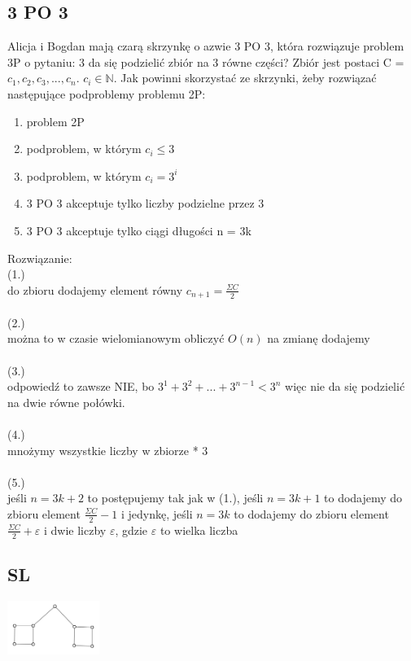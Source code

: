 \documentclass{article}
\begin{document}
\subsection*{3 PO 3}
Alicja i Bogdan mają czarą skrzynkę o azwie 3 PO 3, która rozwiązuje problem 3P o pytaniu: 3 da się podzielić zbiór na 3 równe części?
Zbiór jest postaci C = ${c_1, c_2, c_3, ..., c_n}$. $c_i \in \mathbb{N}$.
Jak powinni skorzystać ze skrzynki, żeby rozwiązać następujące podproblemy problemu 2P: 
\begin{enumerate}
	\item problem 2P
	\item podproblem, w którym $c_i \le 3$
	\item podproblem, w którym $c_i = 3^i$
	\item 3 PO 3 akceptuje tylko liczby podzielne przez 3
	\item 3 PO 3 akceptuje tylko ciągi długości n  =  3k
\end{enumerate}
Rozwiązanie: \\
(1.) \\
do zbioru dodajemy element równy $c_{n+1} =\frac{\Sigma C}{2}$ \\\\
(2.) \\
można to w czasie wielomianowym obliczyć $O(n)$ na zmianę dodajemy \\\\
(3.) \\
odpowiedź to zawsze NIE, bo $3^1 + 3^2 + ... + 3^{n-1} < 3^n$ więc nie da się podzielić na dwie równe połówki. \\\\
(4.) \\
mnożymy wszystkie liczby w zbiorze * 3 \\\\
(5.) \\
jeśli $n = 3k+2$ to postępujemy tak jak w (1.), jeśli $n = 3k+1$ to dodajemy do zbioru element $\frac{\Sigma C}{2}-1$ i jedynkę,
jeśli $n = 3k$ to dodajemy do zbioru element $\frac{\Sigma C}{2} + \varepsilon$ i dwie liczby $\varepsilon$, gdzie $\varepsilon$ to wielka liczba

\subsection*{SL}

\begin{center}
\includegraphics[width=3cm]{jajco}
\end{center}
\end{document}
